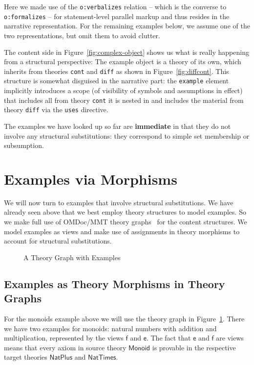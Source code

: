 \documentclass[11pt]{bluenote}
\def\cn#1{\mathsf{#1}}
\def\omdoc{OMDoc\xspace}
\def\omdoc{OMDoc\xspace}
\def\defemph{\textbf}
\begin{document}
Here we made use of the \lstinline|o:verbalizes| relation
-- which is the converse to \lstinline|o:formalizes| -- for statement-level parallel
markup and thus resides in the narrative representation. For the remaining examples below,
we assume one of the two representations, but omit them to avoid clutter.

The content side in Figure~\ref{fig:complex-object} shows us what is really happening from
a structural perspective: The example object is a theory of its own, which inherits from
theories \lstinline|cont| and \lstinline|diff| as shown in Figure~\ref{fig:diffcont}. This
structure is somewhat disguised in the narrative part: the \lstinline|example| element
implicitly introduces a scope (of visibility of symbols and assumptions in effect) that
includes all from theory \lstinline|cont| it is nested in and includes the material from
theory \lstinline|diff| via the \lstinline|uses| directive.

The examples we have looked up so far are \defemph{immediate} in that they do not involve
any structural substitutions: they correspond to simple set membership or subsumption.


\section{Examples via Morphisms}\label{sec:thygraph}

We will now turn to examples that involve structural substitutions. We have already seen
above that we best employ theory structures to model examples. So we make full use of
\omdoc/MMT theory graphs~\cite{RabKoh:WSMSML13} for the content structures. We model
examples as views and make use of assignments in theory morphisms to account for
structural substitutions.

\begin{figure}[ht]\centering
\providecommand\myxscale{4.3}
\providecommand\myyscale{2.5}
\caption{A Theory Graph with Examples}\label{fig:elal}
\end{figure}

\subsection{Examples as Theory Morphisms in Theory Graphs}

For the monoids example above we will use the theory graph in Figure~\ref{fig:elal}.
There we have two examples for monoids: natural numbers with addition and multiplication,
represented by the views $\cn{f}$ and $\cn{e}$. The fact that $\cn{e}$ and
$\cn{f}$ are views means that every axiom in source theory $\cn{Monoid}$ is
provable in the respective target theories $\cn{NatPlus}$ and $\cn{NatTimes}$. 
\end{document}
